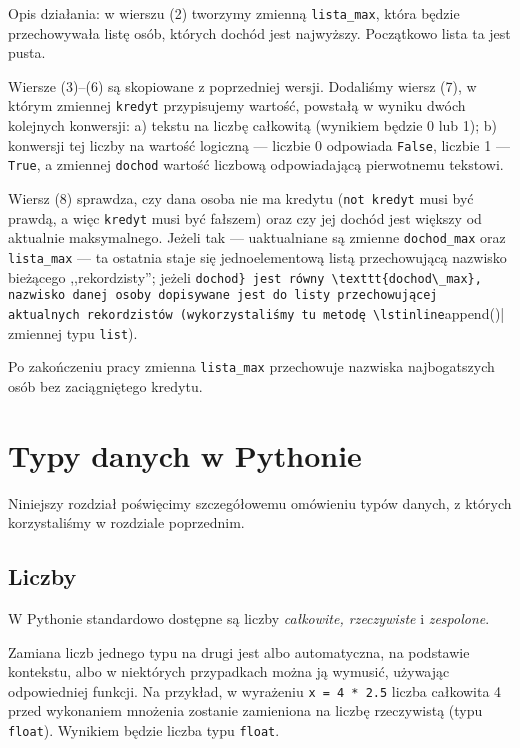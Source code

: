 \documentclass[a4paper]{article}
\begin{document}
Opis działania: w wierszu (2) tworzymy zmienną \texttt{lista\_max}, która będzie przechowywała listę osób, których dochód jest najwyższy. Początkowo lista ta jest pusta.

Wiersze (3)--(6) są skopiowane z poprzedniej wersji. Dodaliśmy wiersz (7), w którym zmiennej \texttt{kredyt} przypisujemy wartość, powstałą w wyniku dwóch kolejnych konwersji: a) tekstu na liczbę całkowitą (wynikiem będzie  0 lub 1); b) konwersji tej liczby na wartość logiczną --- liczbie 0 odpowiada \texttt{False}, liczbie 1 --- \texttt{True}, a zmiennej \texttt{dochod} wartość liczbową odpowiadającą pierwotnemu tekstowi.

Wiersz (8) sprawdza, czy dana osoba nie ma kredytu (\texttt{not kredyt} musi być prawdą, a więc \texttt{kredyt} musi być fałszem) oraz czy jej dochód jest większy od aktualnie maksymalnego. Jeżeli tak --- uaktualniane są zmienne \texttt{dochod\_max} oraz \texttt{lista\_max} --- ta ostatnia staje się jednoelementową listą przechowującą nazwisko bieżącego ,,rekordzisty''; jeżeli \lstinline|dochod} jest równy \texttt{dochod\_max}, nazwisko danej osoby dopisywane jest do listy przechowującej aktualnych rekordzistów (wykorzystaliśmy tu metodę \lstinline|append()| zmiennej typu \lstinline|list|).

Po zakończeniu pracy zmienna \texttt{lista\_max} przechowuje nazwiska najbogatszych osób bez zaciągniętego kredytu.

\section{Typy danych w Pythonie}

Niniejszy rozdział poświęcimy szczegółowemu omówieniu typów danych, z których korzystaliśmy w rozdziale poprzednim.

\subsection{Liczby}

W Pythonie standardowo dostępne są liczby \emph{całkowite, rzeczywiste} i \emph{zespolone}.


Zamiana liczb jednego typu na drugi jest albo automatyczna, na podstawie kontekstu, albo w niektórych przypadkach można ją wymusić, używając odpowiedniej funkcji. Na przykład, w wyrażeniu \lstinline|x = 4 * 2.5| liczba całkowita 4 przed wykonaniem mnożenia zostanie zamieniona na liczbę rzeczywistą (typu \texttt{float}). Wynikiem będzie liczba typu \texttt{float}.
\end{document}
